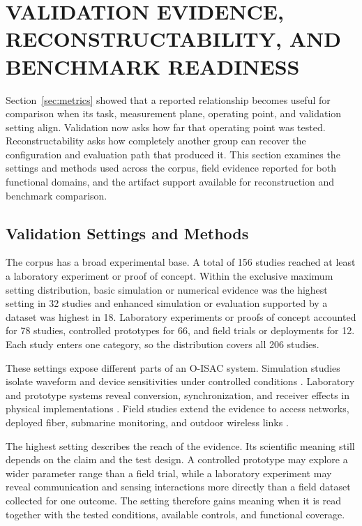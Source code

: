 \section{VALIDATION EVIDENCE, RECONSTRUCTABILITY, AND BENCHMARK READINESS}
\label{sec:validation_reproducibility}

Section~\ref{sec:metrics} showed that a reported relationship becomes useful
for comparison when its task, measurement plane, operating point, and
validation setting align. Validation now asks how far that operating point was
tested. Reconstructability asks how completely another group can recover the
configuration and evaluation path that produced it. This section examines the
settings and methods used across the corpus, field evidence reported for both
functional domains, and the artifact support available for reconstruction and
benchmark comparison.

\subsection{Validation Settings and Methods}

The corpus has a broad experimental base. A total of 156 studies reached at
least a laboratory experiment or proof of concept. Within the exclusive
maximum setting distribution, basic simulation or numerical evidence was the
highest setting in 32 studies and enhanced simulation or evaluation supported
by a dataset was highest in 18. Laboratory experiments or proofs of concept
accounted for 78 studies, controlled prototypes for 66, and field trials or
deployments for 12. Each study enters one category, so the distribution covers
all 206 studies.

These settings expose different parts of an O-ISAC system. Simulation studies
isolate waveform and device sensitivities under controlled conditions
\cite{OISAC_SCR00007,OISAC_SCR00274}. Laboratory and prototype systems reveal
conversion, synchronization, and receiver effects in physical implementations
\cite{OISAC_SCR00001,OISAC_SCR00210,OISAC_SCR00362}. Field studies extend the
evidence to access networks, deployed fiber, submarine monitoring, and outdoor
wireless links
\cite{OISAC_SCR00496,OISAC_SCR00631,OISAC_SCR00957,OISAC_SCR01054,OISAC_SCR01086}.

The highest setting describes the reach of the evidence. Its scientific
meaning still depends on the claim and the test design. A controlled prototype
may explore a wider parameter range than a field trial, while a laboratory
experiment may reveal communication and sensing interactions more directly
than a field dataset collected for one outcome. The setting therefore gains
meaning when it is read together with the tested conditions, available
controls, and functional coverage.

